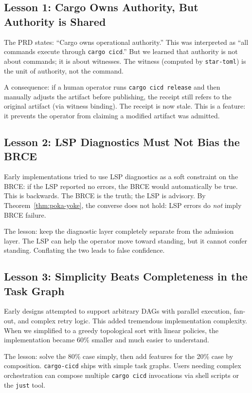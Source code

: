 \subsection{Lesson 1: Cargo Owns Authority, But Authority is Shared}

The PRD states: ``Cargo owns operational authority.'' This was interpreted as ``all commands execute through \texttt{cargo cicd}.'' But we learned that authority is not about commands; it is about witnesses. The witness (computed by \texttt{star-toml}) is the unit of authority, not the command.

A consequence: if a human operator runs \texttt{cargo cicd release} and then manually adjusts the artifact before publishing, the receipt still refers to the original artifact (via witness binding). The receipt is now stale. This is a feature: it prevents the operator from claiming a modified artifact was admitted.

\subsection{Lesson 2: LSP Diagnostics Must Not Bias the BRCE}

Early implementations tried to use LSP diagnostics as a soft constraint on the BRCE: if the LSP reported no errors, the BRCE would automatically be true. This is backwards. The BRCE is the truth; the LSP is advisory. By Theorem~\ref{thm:poka-yoke}, the converse does not hold: LSP errors do \emph{not} imply BRCE failure.

The lesson: keep the diagnostic layer completely separate from the admission layer. The LSP can help the operator move toward standing, but it cannot confer standing. Conflating the two leads to false confidence.

\subsection{Lesson 3: Simplicity Beats Completeness in the Task Graph}

Early designs attempted to support arbitrary DAGs with parallel execution, fan-out, and complex retry logic. This added tremendous implementation complexity. When we simplified to a greedy topological sort with linear policies, the implementation became 60\% smaller and much easier to understand.

The lesson: solve the 80\% case simply, then add features for the 20\% case by composition. \texttt{cargo-cicd} ships with simple task graphs. Users needing complex orchestration can compose multiple \texttt{cargo cicd} invocations via shell scripts or the \texttt{just} tool.

